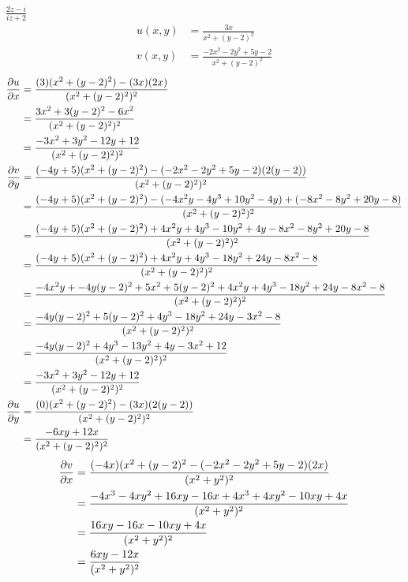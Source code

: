 \item[11.] $\frac{2z-i}{iz+2}$
\begin{align*}
    u(x,y) &= \frac{3x}{x^2+(y-2)^2} \\
    v(x,y) &= \frac{-2x^2-2y^2+5y-2}{x^2+(y-2)^2}
\end{align*}
\begin{align*}
    \frac{\partial u}{\partial x}  
    &= \frac{(3)(x^2+(y-2)^2)-(3x)(2x)}{(x^2+(y-2)^2)^2} \\
    &= \frac{3x^2+3(y-2)^2-6x^2}{(x^2+(y-2)^2)^2} \\
    &= \frac{-3x^2+3y^2-12y+12}{(x^2+(y-2)^2)^2} \\
    \frac{\partial v}{\partial y}  
    &= \frac{(-4y+5)(x^2+(y-2)^2)-(-2x^2-2y^2+5y-2)(2(y-2))}{(x^2+(y-2)^2)^2} \\
    &= \frac{(-4y+5)(x^2+(y-2)^2)-(-4x^2y-4y^3+10y^2-4y)+(-8x^2-8y^2+20y-8)}{(x^2+(y-2)^2)^2} \\
    &= \frac{(-4y+5)(x^2+(y-2)^2)+4x^2y+4y^3-10y^2+4y-8x^2-8y^2+20y-8}{(x^2+(y-2)^2)^2} \\
    &= \frac{(-4y+5)(x^2+(y-2)^2)+4x^2y+4y^3-18y^2+24y-8x^2-8}{(x^2+(y-2)^2)^2} \\
    &= \frac{-4x^2y+-4y(y-2)^2+5x^2+5(y-2)^2+4x^2y+4y^3-18y^2+24y-8x^2-8}{(x^2+(y-2)^2)^2} \\
    &= \frac{-4y(y-2)^2+5(y-2)^2+4y^3-18y^2+24y-3x^2-8}{(x^2+(y-2)^2)^2} \\
    &= \frac{-4y(y-2)^2+4y^3-13y^2+4y-3x^2+12}{(x^2+(y-2)^2)^2} \\
    &= \frac{-3x^2+3y^2-12y+12}{(x^2+(y-2)^2)^2} \\
    \frac{\partial u}{\partial y}  
    &= \frac{(0)(x^2+(y-2)^2)-(3x)(2(y-2))}{(x^2+(y-2)^2)^2} \\
    &= \frac{-6xy+12x}{(x^2+(y-2)^2)^2} \\
\end{align*}
\begin{align*}
    \frac{\partial v}{\partial x}  
    &= \frac{(-4x)(x^2+(y-2)^2-(-2x^2-2y^2+5y-2)(2x)}{(x^2+y^2)^2} \\
    &= \frac{-4x^3-4xy^2+16xy-16x+4x^3+4xy^2-10xy+4x}{(x^2+y^2)^2} \\
    &= \frac{16xy-16x-10xy+4x}{(x^2+y^2)^2} \\
    &= \frac{6xy-12x}{(x^2+y^2)^2} \\
\end{align*}

